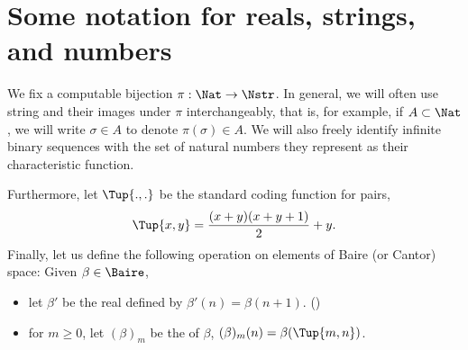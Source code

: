 \documentclass[letterpaper,10pt,english]{jupyterBook}
\begin{document}
\section{Some notation for reals, strings, and numbers}
\label{\detokenize{codingBorel:some-notation-for-reals-strings-and-numbers}}
\sphinxAtStartPar
We fix a computable bijection \(\pi: \Nat \to \Nstr\). In general, we will often use string and their images under \(\pi\) interchangeably, that is, for example, if \(A \subset \Nat\), we will write \(\sigma \in A\) to denote \(\pi(\sigma) \in A\).
We will also freely identify infinite binary sequences with the set of natural numbers they represent as their characteristic function.

\sphinxAtStartPar
Furthermore, let \(\Tup{.,.}\) be the standard coding function for pairs,
\begin{equation*}
\begin{split} 
\Tup{x,y} = \frac{(x+y)(x+y+1)}{2}+y.
\end{split}
\end{equation*}
\sphinxAtStartPar
Finally, let us define the following operation on elements of Baire (or Cantor) space: Given \(\beta\in \Baire\),
\begin{itemize}
\item {} 
\sphinxAtStartPar
let \(\beta'\) be the real defined by \(\beta'(n) = \beta(n+1)\). ()

\item {} 
\sphinxAtStartPar
for \(m \geq 0\), let \((\beta)_m\) be the  of \(\beta\), \((\beta)_m(n) = \beta(\Tup{m,n})\).

\end{itemize}
\end{document}
